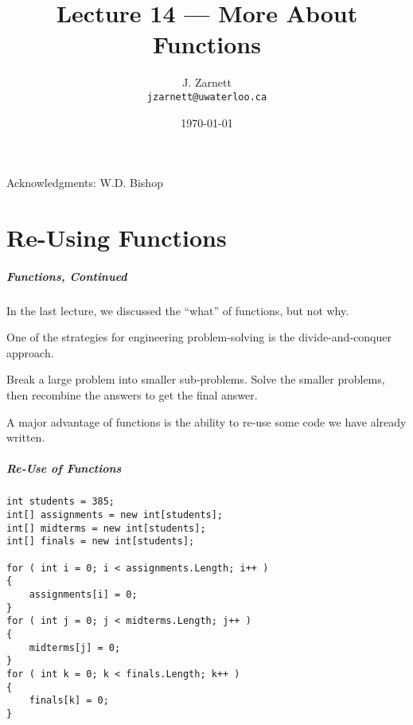 

\title{Lecture 14 --- More About Functions}

\author{J. Zarnett\\
\texttt{jzarnett@uwaterloo.ca}}
\date{\today}



\begin{frame}
  \titlepage
  
  \begin{center}
  \small{Acknowledgments: W.D. Bishop}
  \end{center}
 \end{frame}
 
\part{Re-Using Functions}
\begin{frame}\partpage\end{frame}


\begin{frame}
\frametitle{Functions, Continued}
In the last lecture, we discussed the ``what'' of functions, but not why.

One of the strategies for engineering problem-solving is the \alert{divide-and-conquer} approach.

Break a large problem into smaller sub-problems. Solve the smaller problems, then recombine the answers to get the final answer.

A major advantage of functions is the ability to re-use some code we have already written.

\end{frame}

\begin{frame}[fragile]
\frametitle{Re-Use of Functions}

{\scriptsize
\begin{verbatim}
int students = 385;
int[] assignments = new int[students];
int[] midterms = new int[students];
int[] finals = new int[students];

for ( int i = 0; i < assignments.Length; i++ )
{
    assignments[i] = 0;
}    
for ( int j = 0; j < midterms.Length; j++ )
{
    midterms[j] = 0;
}
for ( int k = 0; k < finals.Length; k++ )
{
    finals[k] = 0;
}
\end{verbatim}
}
\end{frame}


